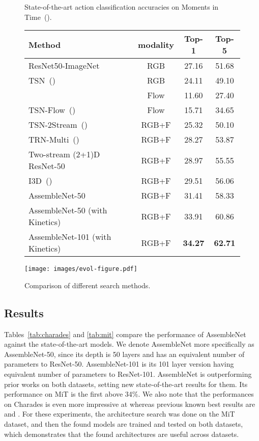 \documentclass{article} \usepackage{iclr2020_conference,times}
\begin{document}
\begin{figure}
\begin{minipage}{0.55\textwidth}
    \small
    \captionsetup{type=table}
    \setlength\tabcolsep{3pt}
    \caption{State-of-the-art action classification accuracies on Moments in Time~(\citealp{monfort2018moments}).}
    \label{tab:mit}
    \begin{tabular}{lccc}
    \toprule
       Method & modality & Top-1 & Top-5 \\
    \midrule
    ResNet50-ImageNet & RGB & 27.16 & 51.68 \\
    TSN~(\citealp{wang2016temporal})  & RGB & 24.11 & 49.10 \\
    \cite{ioffee2015batch} & Flow & 11.60 & 27.40 \\
TSN-Flow~(\citealp{wang2016temporal}) & Flow & 15.71 & 34.65 \\
    TSN-2Stream~(\citealp{wang2016temporal}) & RGB+F & 25.32 & 50.10 \\
    TRN-Multi~(\citealp{zhou2018temporal}) & RGB+F & 28.27 & 53.87 \\
    Two-stream (2+1)D ResNet-50 & RGB+F & 28.97 & 55.55 \\
    I3D~(\citealp{carreira2017quo}) & RGB+F & 29.51 & 56.06 \\
    \hline
AssembleNet-50 & RGB+F & 31.41 & 58.33 \\
    AssembleNet-50 (with Kinetics) & RGB+F & 33.91 & 60.86 \\
AssembleNet-101 (with Kinetics) & RGB+F & \textbf{34.27} & \textbf{62.71} \\
\bottomrule
    \end{tabular}
\end{minipage}\hfill
\begin{minipage}{0.4\textwidth}
      \centering
       \texttt{[image: images/evol-figure.pdf]}\caption{Comparison of different search methods. }
\label{fig:evolution-graph}
\end{minipage}
\end{figure}

\vspace{-5pt}
\subsection{Results}
\vspace{-5pt}

Tables~\ref{tab:charades} and \ref{tab:mit} compare the performance of AssembleNet against the state-of-the-art models. We denote AssembleNet more specifically as AssembleNet-50, since its depth is 50 layers and has an equivalent number of parameters to ResNet-50. AssembleNet-101 is its 101 layer version having equivalent number of parameters to ResNet-101. 
AssembleNet is outperforming prior works on both datasets, setting new state-of-the-art results for them. Its performance on MiT is the first above 34\%. We also note that the performances on Charades is even more impressive at  whereas previous known best results are  and . For these experiments, the architecture search was done on the MiT dataset, and then the found models are trained and tested on both datasets, which demonstrates that the found architectures are useful across datasets.
\end{document}

